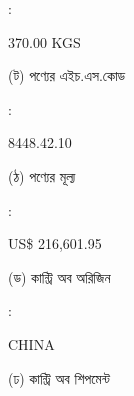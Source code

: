 \documentclass[12pt]{article}
\newcommand{\pkg}{370.00 KGS}
\newcommand{\co}{CHINA}
\newcommand{\hscode}{8448.42.10}
\newcommand{\price}{US\$ 216,601.95}
\begin{document}
\begin{minipage}[t]{0.02\linewidth}
:
\end{minipage}
\begin{minipage}[t]{0.50\linewidth}
{\pkg}
\\
\end{minipage}
\begin{minipage}[t]{0.05\linewidth}
\hspace*{1em}
\end{minipage}
\begin{minipage}[t]{0.45\linewidth}
(ট) পণ্যের এইচ.এস.কোড
\end{minipage}
\begin{minipage}[t]{0.02\linewidth}
:
\end{minipage}
\begin{minipage}[t]{0.50\linewidth}
{\hscode}
\\
\end{minipage}
\begin{minipage}[t]{0.05\linewidth}
\hspace*{1em}
\end{minipage}
\begin{minipage}[t]{0.45\linewidth}
(ঠ) পণ্যের মূল্য
\end{minipage}
\begin{minipage}[t]{0.02\linewidth}
:
\end{minipage}
\begin{minipage}[t]{0.50\linewidth}
{\price}
\\
\end{minipage}
\begin{minipage}[t]{0.05\linewidth}
\hspace*{1em}
\end{minipage}
\begin{minipage}[t]{0.45\linewidth}
(ড) কান্ট্রি অব অরিজিন
\end{minipage}
\begin{minipage}[t]{0.02\linewidth}
:
\end{minipage}
\begin{minipage}[t]{0.50\linewidth}
{\co}
\\
\end{minipage}
\begin{minipage}[t]{0.05\linewidth}
\hspace*{1em}
\end{minipage}
\begin{minipage}[t]{0.45\linewidth}
(ঢ) কান্ট্রি অব শিপমেন্ট
\end{minipage}
\end{document}
